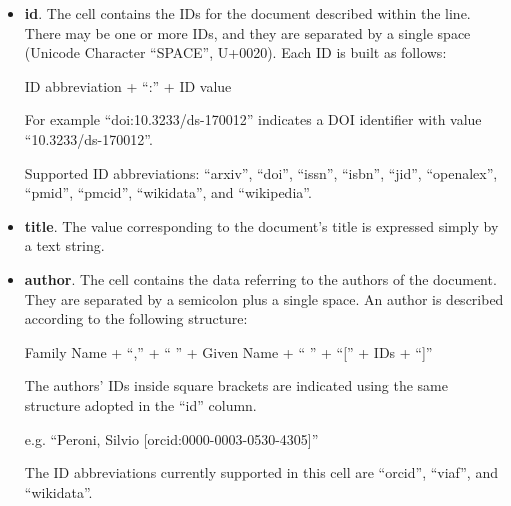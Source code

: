 \documentclass{article}
\begin{document}
\begin{itemize}
  \item \textbf{id}. The cell contains the IDs for the document described within the line. There may be one or more IDs, and they are separated by a single space (Unicode Character “SPACE”, U+0020). Each ID is built as follows:
  \begin{center}ID abbreviation + ``:'' + ID value\end{center}
  For example ``doi:10.3233/ds-170012'' indicates a DOI identifier with value ``10.3233/ds-170012''.

  Supported ID abbreviations: ``arxiv'', ``doi'', ``issn'', ``isbn'', ``jid'', ``openalex'', ``pmid'', ``pmcid'', ``wikidata'', and ``wikipedia''.
  \item \textbf{title}. The value corresponding to the document's title is expressed simply by a text string.
  \item \textbf{author}. The cell contains the data referring to the authors of the document. They are separated by a semicolon plus a single space. An author is described according to the following structure:
  \begin{center}Family Name + ``,'' + `` '' + Given Name + `` '' + ``['' + IDs + ``]''\end{center}
  The authors' IDs inside square brackets are indicated using the same structure adopted in the ``id'' column.
  \begin{center}e.g. ``Peroni, Silvio [orcid:0000-0003-0530-4305]''\end{center}

  The ID abbreviations currently supported in this cell are ``orcid'', ``viaf'', and ``wikidata''.
  

\end{itemize}
\end{document}
